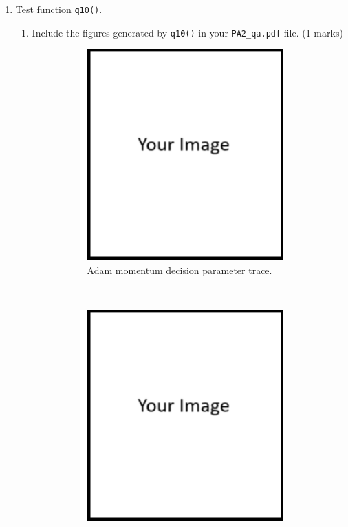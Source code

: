 \documentclass{article}
\theoremstyle{definition}
\newtheorem*{answer}{Answer}
\begin{document}
\begin{enumerate}[label=\ref{adam}.\alph*]
\begin{enumerate}[label=1.3.a.\roman*]
\begin{figure}[h]
\begin{subfigure}[t]{0.5\textwidth}
				\caption{Adam momentum Loss vs. iteration.}
			\end{subfigure}
			\caption{Figures generated by q9().}
		\end{figure}
		\item In 1-2 sentences, compare the performance of adam with momentum method (heavy-ball or Nestrov) (2 marks)
		\begin{answer}
			Your answer ...
		\end{answer}
	\end{enumerate}
	\newpage
	\item Test function \verb|q10()|.
	\begin{enumerate}[label=1.3.b.\roman*]
		\item Include the figures generated by \verb|q10()| in your \verb|PA2_qa.pdf| file. (1 marks)
		\begin{figure}[h]
			\centering
			\begin{subfigure}[t]{0.5\textwidth}
				\centering
				\includegraphics[height=3.2in]{image.png}
				\caption{Adam momentum decision parameter trace.}
			\end{subfigure}%
			~ 
			\begin{subfigure}[t]{0.5\textwidth}
				\centering
				\includegraphics[height=3.2in]{image.png}

\end{subfigure}
\end{figure}
\end{enumerate}
\end{enumerate}
\end{document}
